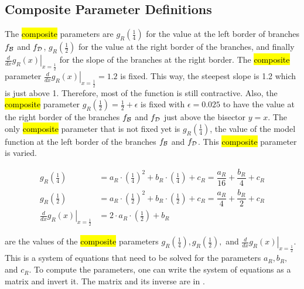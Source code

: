 \subsection{Composite Parameter Definitions}
\label{sec:setup.quad.hyper.params}

The \hl{composite} parameters are $g_R\left(\frac{1}{4}\right)$ for the value at the left border of branches $f_{\mathcal{B}}$ and $f_{\mathcal{D}}$, $g_R\left(\frac{1}{2}\right)$ for the value at the right border of the branches, and finally $\left. \frac{d}{dx} g_R(x) \right|_{x = \frac{1}{2}}$ for the slope of the branches at the right border.
The \hl{composite} parameter $\left. \frac{d}{dx} g_R(x) \right|_{x = \frac{1}{2}} = 1.2$ is fixed.
This way, the steepest slope is 1.2 which is just above 1.
Therefore, most of the function is still contractive.
Also, the \hl{composite} parameter $g_R\left(\frac{1}{2}\right) = \frac{1}{2} + \epsilon$ is fixed with $\epsilon = 0.025$ to have the value at the right border of the branches $f_{\mathcal{B}}$ and $f_{\mathcal{D}}$ just above the bisector $y = x$.
The only \hl{composite} parameter that is not fixed yet is $g_R\left(\frac{1}{4}\right)$, the value of the model function at the left border of the branches $f_{\mathcal{B}}$ and $f_{\mathcal{D}}$.
This \hl{composite} parameter is varied.

\begin{subequations}
	\begin{align}
		g_R\left(\frac{1}{4}\right)                                     & = a_R \cdot \left(\frac{1}{4}\right)^2 + b_R \cdot \left(\frac{1}{4}\right) + c_R = \dfrac{a_R}{16} + \dfrac{b_R}{4} + c_R \label{equ:setup.quad.hyper.A} \\
		g_R\left(\frac{1}{2}\right)                                     & = a_R \cdot \left(\frac{1}{2}\right)^2 + b_R \cdot \left(\frac{1}{2}\right) + c_R = \dfrac{a_R}{4} + \dfrac{b_R}{2} + c_R \label{equ:setup.quad.hyper.B}  \\
		\left. \frac{d}{dx} g_R\left(x\right) \right|_{x = \frac{1}{2}} & = 2 \cdot a_R \cdot \left(\frac{1}{2}\right) + b_R \label{equ:setup.quad.hyper.C}
	\end{align}
\end{subequations}

 are the values of the \hl{composite} parameters $g_R\left(\frac{1}{4}\right), g_R\left(\frac{1}{2}\right),$ and $\left. \frac{d}{dx} g_R\left(x\right) \right|_{x = \frac{1}{2}}$.
This is a system of equations that need to be solved for the parameters $a_R, b_R,$ and $c_R$.
To compute the parameters, one can write the system of equations as a matrix and invert it.
The matrix and its inverse are in .

